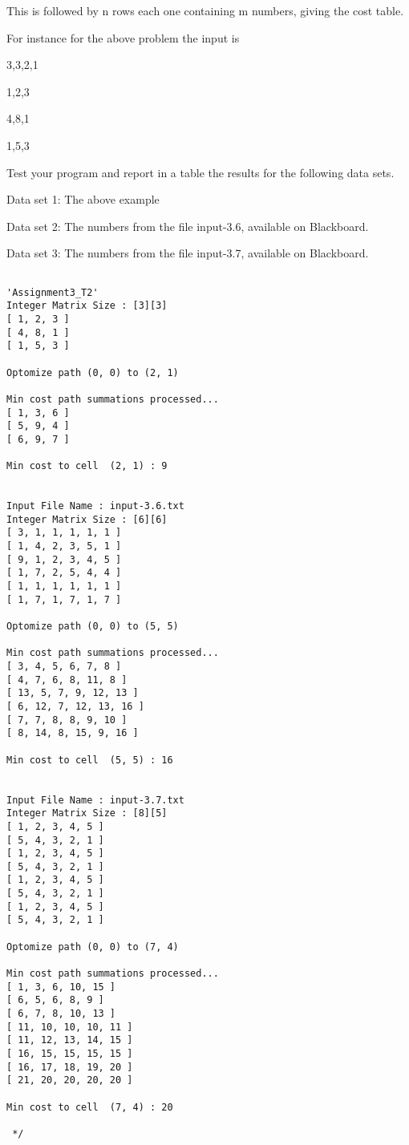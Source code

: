 \documentclass[11pt]{article}
\begin{document}
\begin{enumerate}
This is followed by n rows each one containing m numbers, giving the cost table.

For instance for the above problem the input is

3,3,2,1

1,2,3

4,8,1

1,5,3


Test your program and report in a table the results for the following data sets.

Data set 1:  The above example

Data set 2:  The  numbers from the file input-3.6, available on Blackboard. 

Data set 3:  The  numbers from the file input-3.7, available on Blackboard. 

\pagebreak
\begin{verbatim}
    
'Assignment3_T2' 
Integer Matrix Size : [3][3]
[ 1, 2, 3 ]
[ 4, 8, 1 ]
[ 1, 5, 3 ]

Optomize path (0, 0) to (2, 1)

Min cost path summations processed...
[ 1, 3, 6 ]
[ 5, 9, 4 ]
[ 6, 9, 7 ]

Min cost to cell  (2, 1) : 9


Input File Name : input-3.6.txt
Integer Matrix Size : [6][6]
[ 3, 1, 1, 1, 1, 1 ]
[ 1, 4, 2, 3, 5, 1 ]
[ 9, 1, 2, 3, 4, 5 ]
[ 1, 7, 2, 5, 4, 4 ]
[ 1, 1, 1, 1, 1, 1 ]
[ 1, 7, 1, 7, 1, 7 ]

Optomize path (0, 0) to (5, 5)

Min cost path summations processed...
[ 3, 4, 5, 6, 7, 8 ]
[ 4, 7, 6, 8, 11, 8 ]
[ 13, 5, 7, 9, 12, 13 ]
[ 6, 12, 7, 12, 13, 16 ]
[ 7, 7, 8, 8, 9, 10 ]
[ 8, 14, 8, 15, 9, 16 ]

Min cost to cell  (5, 5) : 16


Input File Name : input-3.7.txt
Integer Matrix Size : [8][5]
[ 1, 2, 3, 4, 5 ]
[ 5, 4, 3, 2, 1 ]
[ 1, 2, 3, 4, 5 ]
[ 5, 4, 3, 2, 1 ]
[ 1, 2, 3, 4, 5 ]
[ 5, 4, 3, 2, 1 ]
[ 1, 2, 3, 4, 5 ]
[ 5, 4, 3, 2, 1 ]

Optomize path (0, 0) to (7, 4)

Min cost path summations processed...
[ 1, 3, 6, 10, 15 ]
[ 6, 5, 6, 8, 9 ]
[ 6, 7, 8, 10, 13 ]
[ 11, 10, 10, 10, 11 ]
[ 11, 12, 13, 14, 15 ]
[ 16, 15, 15, 15, 15 ]
[ 16, 17, 18, 19, 20 ]
[ 21, 20, 20, 20, 20 ]

Min cost to cell  (7, 4) : 20

 */
\end{verbatim}



\end{enumerate}
\end{document}
